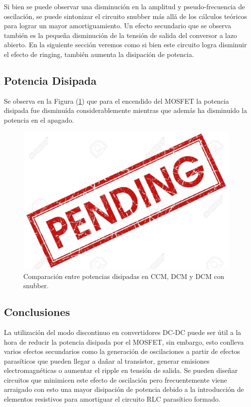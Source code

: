Si bien se puede observar una disminución en la amplitud y pseudo-frecuencia de oscilación, se puede sintonizar el circuito snubber más allá de los cálculos teóricos para lograr un mayor amortiguamiento. Un efecto secundario que se observa también es la pequeña disminución de la tensión de salida del conversor a lazo abierto. En la siguiente sección veremos como si bien este circuito logra disminuir el efecto de ringing, también aumenta la disipación de potencia.

\subsection{Potencia Disipada}

Se observa en la Figura (\ref{ej4:fig:pots}) que para el encendido del MOSFET la potencia disipada fue disminuída considerablemente mientras que además ha disminuído la potencia en el apagado.

\begin{figure}[H]
	\centering
	\includegraphics[width=0.9\linewidth]{ImagenesEjercicio-4/pend}%
	\caption{Comparación entre potencias disipadas en CCM, DCM y DCM con snubber.}
	\label{ej4:fig:pots}
\end{figure}


\subsection{Conclusiones}
La utilización del modo discontinuo en convertidores DC-DC puede ser útil a la hora de reducir la potencia disipada por el MOSFET, sin embargo, esto conlleva varios efectos secundarios como la generación de oscilaciones a partir de efectos parasíticos que pueden llegar a dañar al transistor, generar emisiones electromagnéticas o aumentar el ripple en tensión de salida. Se pueden diseñar circuitos que minimicen este efecto de oscilación pero frecuentemente viene arraigado con esto una mayor disipación de potencia debido a la introducción de elementos resistivos para amortiguar el circuito RLC parasítico formado.

